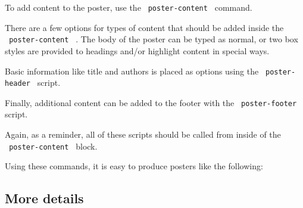 To add content to the poster, use the \texttt{\ poster-content\ }
command.

\begin{Shaded}
\begin{Highlighting}[]
\NormalTok{\#poster{-}content()[}
\NormalTok{]}
\end{Highlighting}
\end{Shaded}

There are a few options for types of content that should be added inside
the \texttt{\ poster-content\ } . The body of the poster can be typed as
normal, or two box styles are provided to headings and/or highlight
content in special ways.

\begin{Shaded}
\begin{Highlighting}[]
\end{Highlighting}
\end{Shaded}

Basic information like title and authors is placed as options using the
\texttt{\ poster-header\ } script.

\begin{Shaded}
\begin{Highlighting}[]
\NormalTok{)}
\end{Highlighting}
\end{Shaded}

Finally, additional content can be added to the footer with the
\texttt{\ poster-footer\ } script.

\begin{Shaded}
\begin{Highlighting}[]
\end{Highlighting}
\end{Shaded}

Again, as a reminder, all of these scripts should be called from inside
of the \texttt{\ poster-content\ } block.

Using these commands, it is easy to produce posters like the following:

\subsection{More details}\label{more-details}

